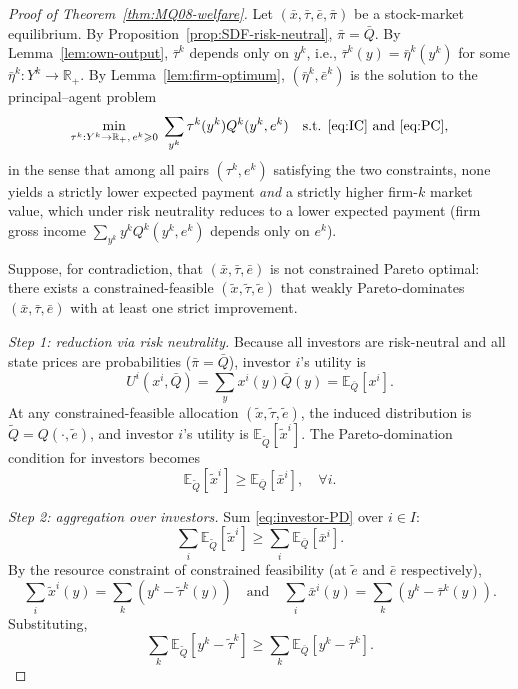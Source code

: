 \documentclass[11pt,a4paper,oneside]{book}
\def\R{\mathbb{R}}
\def\E{\mathbb{E}}
\def\geq{\geqslant}
\def\et{\quad \text{and} \quad}
\theoremstyle{plain}
\theoremstyle{definition}
\theoremstyle{remark}
\numberwithin{equation}{chapter}
\begin{document}
\begin{proof}[Proof of Theorem~\ref{thm:MQ08-welfare}]
Let $(\bar{x}, \bar{\tau}, \bar{e}, \bar{\pi})$ be a stock-market equilibrium.
By Proposition~\ref{prop:SDF-risk-neutral}, $\bar{\pi} = \bar{Q}$.
By Lemma~\ref{lem:own-output}, $\bar{\tau}^k$ depends only on $y^k$, i.e., $\bar{\tau}^k(y) = \bar{\eta}^k(y^k)$ for some $\bar{\eta}^k : Y^k \to \R_+$.
By Lemma~\ref{lem:firm-optimum}, $(\bar{\eta}^k, \bar{e}^k)$ is the solution to the principal--agent problem
\begin{equation}\label{eq:PA-firm-k}
  \min_{\tau^k : Y^k \to \R_+, \, e^k \geq 0} \; \sum_{y^k} \tau^k(y^k) Q^k(y^k, e^k)
  \quad \text{s.t. \eqref{eq:IC} and \eqref{eq:PC}},
\end{equation}
in the sense that among all pairs $(\tau^k, e^k)$ satisfying the two constraints, none yields a strictly lower expected payment \emph{and} a strictly higher firm-$k$ market value, which under risk neutrality reduces to a lower expected payment (firm gross income $\sum_{y^k} y^k Q^k(y^k, e^k)$ depends only on $e^k$).

Suppose, for contradiction, that $(\bar{x}, \bar{\tau}, \bar{e})$ is not constrained Pareto optimal: there exists a constrained-feasible $(\widetilde{x}, \widetilde{\tau}, \widetilde{e})$ that weakly Pareto-dominates $(\bar{x}, \bar{\tau}, \bar{e})$ with at least one strict improvement.

\emph{Step 1: reduction via risk neutrality.}
Because all investors are risk-neutral and all state prices are probabilities ($\bar{\pi} = \bar{Q}$), investor $i$'s utility is
\begin{equation*}
  U^i(x^i, \bar{Q}) = \sum_{y} x^i(y) \bar{Q}(y) = \E_{\bar{Q}}[x^i].
\end{equation*}
At any constrained-feasible allocation $(\widetilde{x}, \widetilde{\tau}, \widetilde{e})$, the induced distribution is $\widetilde{Q} = Q(\cdot, \widetilde{e})$, and investor $i$'s utility is $\E_{\widetilde{Q}}[\widetilde{x}^i]$.
The Pareto-domination condition for investors becomes
\begin{equation}\label{eq:investor-PD}
  \E_{\widetilde{Q}}[\widetilde{x}^i] \geq \E_{\bar{Q}}[\bar{x}^i], \quad \forall i.
\end{equation}

\emph{Step 2: aggregation over investors.}
Sum \eqref{eq:investor-PD} over $i \in I$:
\begin{equation*}
  \sum_{i} \E_{\widetilde{Q}}[\widetilde{x}^i] \geq \sum_{i} \E_{\bar{Q}}[\bar{x}^i].
\end{equation*}
By the resource constraint of constrained feasibility (at $\widetilde{e}$ and $\bar{e}$ respectively),
\begin{equation*}
  \sum_{i} \widetilde{x}^i(y) = \sum_{k} (y^k - \widetilde{\tau}^k(y))
  \et
  \sum_{i} \bar{x}^i(y) = \sum_{k} (y^k - \bar{\tau}^k(y)).
\end{equation*}
Substituting,
\begin{equation}\label{eq:agg-investor-PD}
  \sum_{k} \E_{\widetilde{Q}}[y^k - \widetilde{\tau}^k] \geq \sum_{k} \E_{\bar{Q}}[y^k - \bar{\tau}^k].
\end{equation}


\end{proof}
\end{document}
